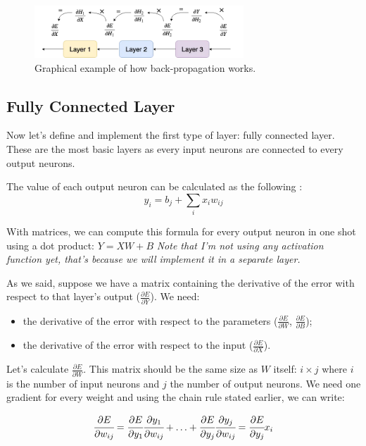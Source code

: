 \begin{figure}[htb]
	\centering
	\includegraphics[width=0.7\textwidth]{figures/backpropagation_from_scratch}
	\caption{Graphical example of how back-propagation works.}
	\label{fig:backpropagation_from_scratch}
\end{figure}

\subsection{Fully Connected Layer}
Now let's define and implement the first type of layer: fully connected layer. These are the most basic layers as every input neurons are connected to every output neurons.

The value of each output neuron can be calculated as the following :
\begin{equation}
	y_i = b_j + \sum_i x_i w_{ij}
\end{equation}

With matrices, we can compute this formula for every output neuron in one shot using a dot product: $Y=XW+B$
\emph{Note that I’m not using any activation function yet, that’s because we will implement it in a separate layer.}

As we said, suppose we have a matrix containing the derivative of the error with respect to that layer’s output ($\frac{\partial E}{\partial Y}$). We need:
\begin{itemize}
	\item the derivative of the error with respect to the parameters ($\frac{\partial E}{\partial W}$, $\frac{\partial E}{\partial B}$);
	\item the derivative of the error with respect to the input ($\frac{\partial E}{\partial X}$).
\end{itemize}

Let's calculate $\frac{\partial E}{\partial W}$. This matrix should be the same size as $W$ itself: $i\times j$ where $i$ is the number of input neurons and $j$ the number of output neurons. We need one gradient for every weight and using the chain rule stated earlier, we can write:

\begin{equation}
	\cfrac{\partial E}{\partial w_{ij}} = \cfrac{\partial E}{\partial y_1}\cfrac{\partial y_1}{\partial w_{ij}} + \ldots + \cfrac{\partial E}{\partial y_j}\cfrac{\partial y_j}{\partial w_{ij}} = \cfrac{\partial E}{\partial y_j}x_i 
\end{equation}

